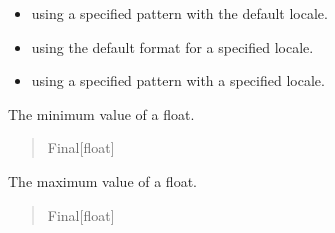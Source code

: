 \documentclass[letterpaper,10pt,english]{sphinxmanual}
\begin{document}
\begin{fulllineitems}
\begin{itemize}
\item {} 
\sphinxAtStartPar
using a specified pattern with the default locale.

\item {} 
\sphinxAtStartPar
using the default format for a specified locale.

\item {} 
\sphinxAtStartPar
using a specified pattern with a specified locale.

\end{itemize}

\begin{fulllineitems}
\label{\detokenize{apache_commons_validator_python.routines:apache_commons_validator_python.routines.float_validator.FloatValidator.FLOAT_MIN}}
\pysigstartsignatures
{}
\pysigstopsignatures
\sphinxAtStartPar
The minimum value of a float.
\begin{quote}\begin{description}
\sphinxAtStartPar
Final{[}float{]}

\end{description}\end{quote}

\end{fulllineitems}


\begin{fulllineitems}
\label{\detokenize{apache_commons_validator_python.routines:apache_commons_validator_python.routines.float_validator.FloatValidator.FLOAT_MAX}}
\pysigstartsignatures
{}
\pysigstopsignatures
\sphinxAtStartPar
The maximum value of a float.
\begin{quote}\begin{description}
\sphinxAtStartPar
Final{[}float{]}

\end{description}\end{quote}


\end{fulllineitems}
\end{fulllineitems}
\end{document}
